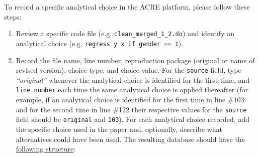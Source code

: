 \documentclass[]{book}
\begin{document}
To record a specific analytical choice in the ACRE platform, please follow these steps:

\begin{enumerate}
\def\labelenumi{\arabic{enumi}.}
\item
  Review a specific code file (e.g. \texttt{clean\_merged\_1\_2.do}) and identify an analytical choice (e.g. \texttt{regress\ y\ x\ if\ gender\ ==\ 1}).
\item
  Record the file name, line number, reproduction package (original or name of revised version), choice type, and choice value. For the \texttt{source} field, type \emph{``original''} whenever the analytical choice is identified for the first time, and \texttt{line\ number} each time the same analytical choice is applied thereafter (for example, if an analytical choice is identified for the first time in line \#103 and for the second time in line \#122 their respective values for the \texttt{source} field should be \texttt{original} and \texttt{103}). For each analytical choice recorded, add the specific choice used in the paper and, optionally, describe what alternatives could have been used. The resulting database should have the \href{https://docs.google.com/spreadsheets/d/1nZuJSHswbZgaaIfBcyIUGPwG-WIP8zE1Oambud-WoDc/edit?usp=sharing}{following structure}:
\end{enumerate}
\end{document}
